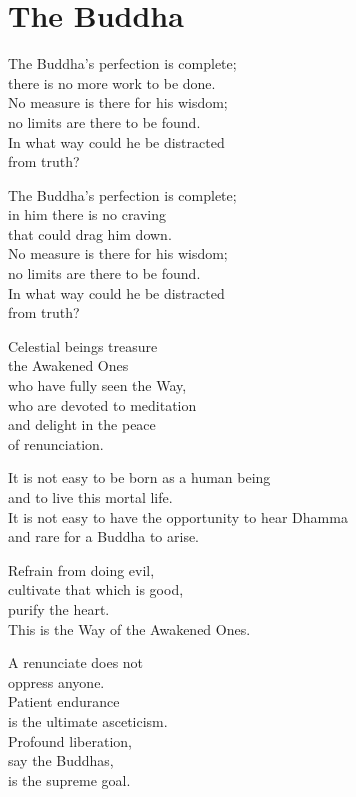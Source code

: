 
\chapter{The Buddha}


The Buddha's perfection is complete;\\
there is no more work to be done.\\
No measure is there for his wisdom;\\
no limits are there to be found.\\
In what way could he be distracted\\
from truth?


The Buddha's perfection is complete;\\
in him there is no craving\\
that could drag him down.\\
No measure is there for his wisdom;\\
no limits are there to be found.\\
In what way could he be distracted\\
from truth?


Celestial beings treasure\\
the Awakened Ones\\
who have fully seen the Way,\\
who are devoted to meditation\\
and delight in the peace\\
of renunciation.


It is not easy to be born as a human being\\
and to live this mortal life.\\
It is not easy to have the opportunity to hear Dhamma\\
and rare for a Buddha to arise.


Refrain from doing evil,\\
cultivate that which is good,\\
purify the heart.\\
This is the Way of the Awakened Ones.


A renunciate does not\\
oppress anyone.\\
Patient endurance\\
is the ultimate asceticism.\\
Profound liberation,\\
say the Buddhas,\\
is the supreme goal.


